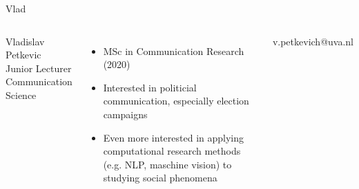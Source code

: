 \documentclass[handout]{beamer}
\begin{document}
\begin{frame}{Vlad}
	\begin{columns}
		Vladislav Petkevic \\
		Junior Lecturer Communication Science \\
		\begin{itemize}
			\item MSc in Communication Research (2020)
			\item Interested in politicial communication, especially election campaigns
			\item Even more interested in applying computational research methods (e.g. NLP, maschine vision) to studying social phenomena
		\end{itemize}
		v.petkevich@uva.nl
	\end{columns}
\end{frame}
\end{document}
